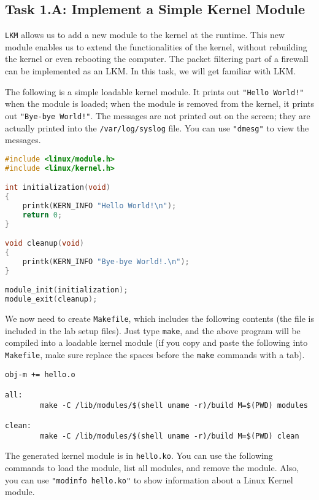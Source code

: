 \subsection{Task 1.A: Implement a Simple Kernel Module}


{\tt LKM} allows us to add a new module to the kernel at the runtime. 
This new module enables us to extend the functionalities of the kernel,
without rebuilding the kernel or even rebooting the computer. 
The packet filtering part of a firewall can be implemented as an LKM. 
In this task, we will get familiar with LKM.


The following is a simple loadable kernel module. It prints out 
\texttt{"Hello World!"} when the module is loaded; when the module
is removed from the kernel, it prints out \texttt{"Bye-bye World!"}.
The messages are not printed out on the screen; they are 
actually printed into the \texttt{/var/log/syslog} file. You can
use \texttt{"dmesg"} to view the messages. 


\begin{lstlisting}[language=C, caption=\texttt{hello.c} (included in the lab setup files)]
#include <linux/module.h>
#include <linux/kernel.h>

int initialization(void)
{
    printk(KERN_INFO "Hello World!\n");
    return 0;
}

void cleanup(void)
{
    printk(KERN_INFO "Bye-bye World!.\n");
}

module_init(initialization);
module_exit(cleanup);
\end{lstlisting}

We now need to create {\tt Makefile}, which includes the following
contents (the file is included in the lab setup files). 
Just type {\tt make}, and the above program will be compiled
into a loadable kernel module (if you copy and paste the following
into \texttt{Makefile}, make sure replace the spaces before the 
\texttt{make} commands with a tab).

\begin{lstlisting}
obj-m += hello.o

all:
        make -C /lib/modules/$(shell uname -r)/build M=$(PWD) modules

clean:
        make -C /lib/modules/$(shell uname -r)/build M=$(PWD) clean
\end{lstlisting}


The generated kernel module is in \texttt{hello.ko}.  
You can use the following commands to 
load the module, list all modules, and remove the module. 
Also, you can use \texttt{"modinfo hello.ko"} to show information about a 
Linux Kernel module.

